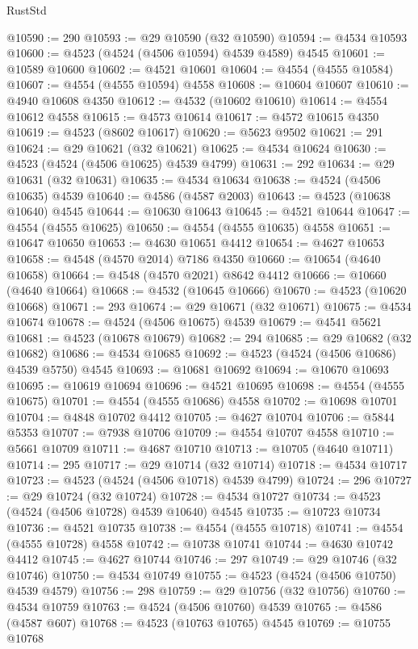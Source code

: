 \begin{lexlean}{RustStd}
\begin{coremodule}
@10590 := 290
@10593 := @29 @10590 (@32 @10590)
@10594 := @4534 @10593
@10600 := @4523 (@4524 (@4506 @10594) @4539 @4589) @4545
@10601 := @10589 @10600
@10602 := @4521 @10601
@10604 := @4554 (@4555 @10584)
@10607 := @4554 (@4555 @10594) @4558
@10608 := @10604 @10607
@10610 := @4940 @10608 @4350
@10612 := @4532 (@10602 @10610)
@10614 := @4554 @10612 @4558
@10615 := @4573 @10614
@10617 := @4572 @10615 @4350
@10619 := @4523 (@8602 @10617)
@10620 := @5623 @9502
@10621 := 291
@10624 := @29 @10621 (@32 @10621)
@10625 := @4534 @10624
@10630 := @4523 (@4524 (@4506 @10625) @4539 @4799)
@10631 := 292
@10634 := @29 @10631 (@32 @10631)
@10635 := @4534 @10634
@10638 := @4524 (@4506 @10635) @4539
@10640 := @4586 (@4587 @2003)
@10643 := @4523 (@10638 @10640) @4545
@10644 := @10630 @10643
@10645 := @4521 @10644
@10647 := @4554 (@4555 @10625)
@10650 := @4554 (@4555 @10635) @4558
@10651 := @10647 @10650
@10653 := @4630 @10651 @4412
@10654 := @4627 @10653
@10658 := @4548 (@4570 @2014) @7186 @4350
@10660 := @10654 (@4640 @10658)
@10664 := @4548 (@4570 @2021) @8642 @4412
@10666 := @10660 (@4640 @10664)
@10668 := @4532 (@10645 @10666)
@10670 := @4523 (@10620 @10668)
@10671 := 293
@10674 := @29 @10671 (@32 @10671)
@10675 := @4534 @10674
@10678 := @4524 (@4506 @10675) @4539
@10679 := @4541 @5621
@10681 := @4523 (@10678 @10679)
@10682 := 294
@10685 := @29 @10682 (@32 @10682)
@10686 := @4534 @10685
@10692 := @4523 (@4524 (@4506 @10686) @4539 @5750) @4545
@10693 := @10681 @10692
@10694 := @10670 @10693
@10695 := @10619 @10694
@10696 := @4521 @10695
@10698 := @4554 (@4555 @10675)
@10701 := @4554 (@4555 @10686) @4558
@10702 := @10698 @10701
@10704 := @4848 @10702 @4412
@10705 := @4627 @10704
@10706 := @5844 @5353
@10707 := @7938 @10706
@10709 := @4554 @10707 @4558
@10710 := @5661 @10709
@10711 := @4687 @10710
@10713 := @10705 (@4640 @10711)
@10714 := 295
@10717 := @29 @10714 (@32 @10714)
@10718 := @4534 @10717
@10723 := @4523 (@4524 (@4506 @10718) @4539 @4799)
@10724 := 296
@10727 := @29 @10724 (@32 @10724)
@10728 := @4534 @10727
@10734 := @4523 (@4524 (@4506 @10728) @4539 @10640) @4545
@10735 := @10723 @10734
@10736 := @4521 @10735
@10738 := @4554 (@4555 @10718)
@10741 := @4554 (@4555 @10728) @4558
@10742 := @10738 @10741
@10744 := @4630 @10742 @4412
@10745 := @4627 @10744
@10746 := 297
@10749 := @29 @10746 (@32 @10746)
@10750 := @4534 @10749
@10755 := @4523 (@4524 (@4506 @10750) @4539 @4579)
@10756 := 298
@10759 := @29 @10756 (@32 @10756)
@10760 := @4534 @10759
@10763 := @4524 (@4506 @10760) @4539
@10765 := @4586 (@4587 @607)
@10768 := @4523 (@10763 @10765) @4545
@10769 := @10755 @10768

\end{coremodule}
\end{lexlean}
